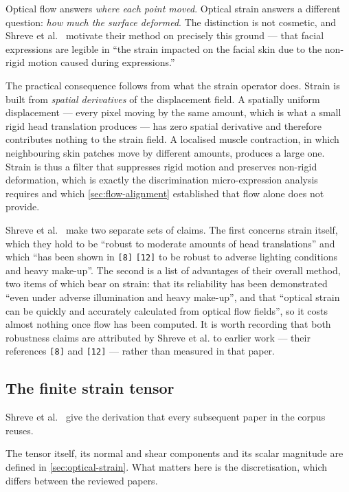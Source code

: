 Optical flow answers \textit{where each point moved}. Optical strain answers a different question: \textit{how much the surface deformed}. The distinction is not cosmetic, and Shreve et al.~\cite{shreve2011} motivate their method on precisely this ground --- that facial expressions are legible in ``the strain impacted on the facial skin due to the non-rigid motion caused during expressions.''

The practical consequence follows from what the strain operator does. Strain is built from \textit{spatial derivatives} of the displacement field. A spatially uniform displacement --- every pixel moving by the same amount, which is what a small rigid head translation produces --- has zero spatial derivative and therefore contributes nothing to the strain field. A localised muscle contraction, in which neighbouring skin patches move by different amounts, produces a large one. Strain is thus a filter that suppresses rigid motion and preserves non-rigid deformation, which is exactly the discrimination micro-expression analysis requires and which \autoref{sec:flow-alignment} established that flow alone does not provide.

Shreve et al.~\cite{shreve2011} make two separate sets of claims. The first concerns strain itself, which they hold to be ``robust to moderate amounts of head translations'' and which ``has been shown in \texttt{[8]} \texttt{[12]} to be robust to adverse lighting conditions and heavy make-up''. The second is a list of advantages of their overall method, two items of which bear on strain: that its reliability has been demonstrated ``even under adverse illumination and heavy make-up'', and that ``optical strain can be quickly and accurately calculated from optical flow fields'', so it costs almost nothing once flow has been computed. It is worth recording that both robustness claims are attributed by Shreve et al. to earlier work --- their references \texttt{[8]} and \texttt{[12]} --- rather than measured in that paper.

\subsection{The finite strain tensor}
\label{sec:strain-tensor}

Shreve et al.~\cite{shreve2011} give the derivation that every subsequent paper in the corpus reuses.

The tensor itself, its normal and shear components and its scalar magnitude are defined in \autoref{sec:optical-strain}. What matters here is the discretisation, which differs between the reviewed papers.

